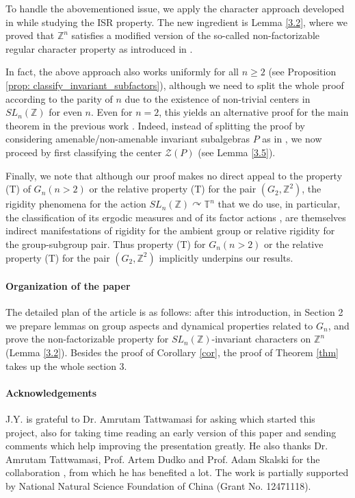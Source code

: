 \documentclass[12pt]{amsart}
\theoremstyle{definition}
\theoremstyle{remark}
\begin{document}
To handle the abovementioned issue, we apply the character approach developed in \cites{jz,dj} while studying the ISR property. The new ingredient is Lemma \ref{3.2}, where we proved that $\mathbb{Z}^n$ satisfies a modified version of the so-called non-factorizable regular character property as introduced in \cite{dj}.

In fact, the above approach also works uniformly for all $n\geq 2$ (see Proposition \ref{prop: classify_invariant_subfactors}), although we need to split the whole proof according to the parity of $n$ due to the existence of non-trivial centers in $SL_n(\mathbb{Z})$ for even $n$. Even for $n=2$, this yields an alternative proof for the main theorem in the previous work \cite{jiangliu}. Indeed, instead of splitting the proof by considering amenable/non-amenable invariant subalgebras $P$ as in \cite{jiangliu}, we now proceed by first classifying the center $\mathcal{Z}(P)$ (see Lemma \ref{3.5}).

Finally, we note that although our proof makes no direct appeal to the property (T) of $G_n (n>2)$ or the relative property (T) for the pair $(G_2, \mathbb{Z}^2)$, the rigidity phenomena for the action $SL_n(\mathbb{Z})\curvearrowright \mathbb{T}^n$ that we do use, in particular, the classification of its ergodic measures \cite[Proposition 9]{burger} and of its factor actions \cite[Example 5.9]{wit}, are themselves indirect manifestations of rigidity for the ambient group or relative rigidity for the group-subgroup pair. Thus property (T) for $G_n (n>2)$ or the relative property (T) for the pair $(G_2, \mathbb{Z}^2)$ implicitly underpins our results. \\


\paragraph{\textbf{Organization of the paper}} The detailed plan of the article is as follows: after this introduction, in Section 2 we prepare lemmas on group aspects and dynamical properties related to $G_n$, and prove the non-factorizable property for $SL_n(\mathbb{Z})$-invariant characters on $\mathbb{Z}^n$ (Lemma \ref{3.2}). Besides the proof of Corollary \ref{cor}, the proof of Theorem \ref{thm} takes up the whole section 3. \\


\paragraph{\textbf{Acknowledgements}} 
J.Y. is grateful to Dr. Amrutam Tattwamasi for asking \cite[Question 4.1]{jiangliu} which started this project, also for taking time reading an early version of this paper and sending comments which help improving the presentation greatly. He also thanks Dr. Amrutam Tattwamasi, Prof. Artem Dudko and Prof. Adam Skalski for the collaboration \cite{adjs}, from which he has benefited a lot.
The work is partially supported by National Natural Science Foundation of China (Grant No. 12471118).
\end{document}
